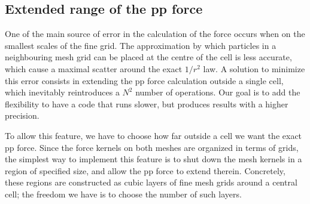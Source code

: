 \subsection{Extended range of the pp force}
\label{subsec:extendedpp} 

One of the main source of error in the calculation of the force occurs when on the smallest scales of the fine grid.
The approximation by which particles in a neighbouring mesh grid can be placed at the centre of the cell
is less accurate, which cause a maximal scatter around the exact $1/r^2$ law.
A solution to minimize this error consists in extending the pp force calculation outside a single cell,
which inevitably reintroduces a $N^2$ number of operations. Our goal is to add the flexibility to have a code
that runs slower, but produces results with a higher precision. 

To allow this feature, we  have to choose how far outside a cell we want the exact pp force.  
Since the force kernels on both meshes are organized in terms of grids, the simplest way to implement this 
feature is to shut down the mesh kernels in a region of specified size, and allow the pp force to extend therein.
Concretely, these regions are constructed as cubic layers of fine mesh grids around a central cell; 
the freedom we have is to choose the number of such layers.
 
